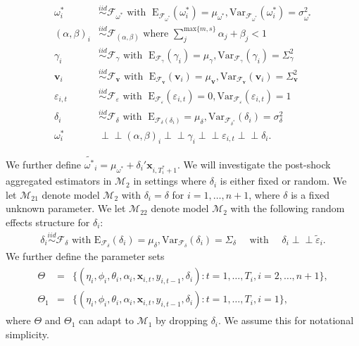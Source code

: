 \documentclass[11pt]{article}
\def\mbf#1{\mathbf{#1}} %
\newcommand{\simiid}{\stackrel{iid}{\sim}} %
\newcommand{\indep}{\perp \!\!\! \perp } %
\def\mrm#1{\mathrm{#1}} %
\def\t#1{\tilde{#1}} %
\def\mc#1{\mathcal{#1}} %
\def\mc#1{\mathcal{#1}}
\theoremstyle{definition}
\begin{document}
\begin{align*}
\omega^{*}_i &\simiid \mc{F}_{\omega^{*}} \text{ with }  \; \mrm{E}_{\mc{F}_{\omega^{*}}}(\omega^{*}_i) = \mu_{\omega^{*}}, \mrm{Var}_{\mc{F}_{\omega^{*}}}(\omega^{*}_i)  = \sigma^2_{\omega^{*}}  \\
(\alpha, \beta)_i &\simiid \mc{F}_{(\alpha, \beta)} \text{ where } \sum^{ \text{max} \{m,s \} }_{j}\alpha_j + \beta_j < 1 \\
   \gamma_i &\simiid \mc{F}_{\gamma} \text{ with }  \; \mrm{E}_{\mc{F}_{\gamma}}(\gamma_i) = \mu_{\gamma}, \mrm{Var}_{\mc{F}_{\gamma}}(\gamma_i)  = \Sigma^2_{\gamma} \\
   \mathbf{v}_i &\simiid \mc{F}_{\mathbf{v}} \text{ with }  \; \mrm{E}_{\mc{F}_{\mathbf{v}}}(\mathbf{v}_i) = \mu_{\mathbf{v}}, \mrm{Var}_{\mc{F}_{\mathbf{v}}}(\mathbf{v}_i)  = \Sigma^2_{\mathbf{v}} \\
\varepsilon_{i,t} & \simiid  \mc{F}_{\varepsilon} \text{ with }  \; \mrm{E}_{\mc{F}_{\varepsilon}}(\varepsilon_{i,t}) = 0, \mrm{Var}_{\mc{F}_{\varepsilon}}(\varepsilon_{i,t})  = 1 \\
\delta_i &\simiid \mc{F}_{\delta} \text{ with }  \; \mrm{E}_{\mc{F}_{\delta}(\delta_i)} = \mu_{\delta}, \mrm{Var}_{\mc{F}_{\delta^{*}}}(\delta_i)  = \sigma^{2}_{\delta} \\
\omega^{*}_i &\indep  (\alpha, \beta)_i \indep \gamma_i \indep \varepsilon_{i,t} \indep \delta_{i}.
\end{align*}

We further define 
$\widetilde{\omega^{*}}_i=\mu_{\omega^{*}}+\delta_i'\mbf{x}_{i, T_i^*+1}$. 
We will investigate the post-shock aggregated estimators in $\mc{M}_2$ 
in settings where $\delta_i$ is either fixed or random. 
We let $\mc{M}_{21}$ denote model $\mc{M}_{2}$ with $\delta_i = \delta$ for $i= 1, \ldots, n+1$, 
where $\delta$ is a  fixed unknown parameter.
We let $\mc{M}_{22}$ denote model $\mc{M}_{2}$ with the following random effects 
structure for $\delta_i$:
\begin{align*}
\delta_i\simiid  \mc{F}_{\delta} \text{ with }\mrm{E}_{\mc{F}_{\delta}}(\delta_i)=\mu_{\delta}, \mrm{Var}_{\mc{F}_{\delta}}(\delta_i)=\Sigma_\delta 
   \quad \text{ with } \quad  \delta_i  \indep \t{\varepsilon}_{i}.
\end{align*}
We further define the parameter sets
\begin{align}
  \begin{array}{lll}
     \Theta &= &\{(\eta_i, \phi_i, \theta_i, \alpha_i, \mbf{x}_{i,t}, y_{i,t-1}, \delta_i)\colon t= 1, \ldots, T_i, i = 2, \ldots, n +1\},\\
    \Theta_1 &= &\{(\eta_i, \phi_i, \theta_i, \alpha_i, \mbf{x}_{i,t}, y_{i,t-1}, \delta_i)\colon t= 1, \ldots, T_i, i = 1\},\label{parameter}
  \end{array}
\end{align}
where $\Theta$ and $\Theta_1$ can adapt to $\mc{M}_1$ by dropping $\delta_i$. We assume this for notational simplicity.
\end{document}

